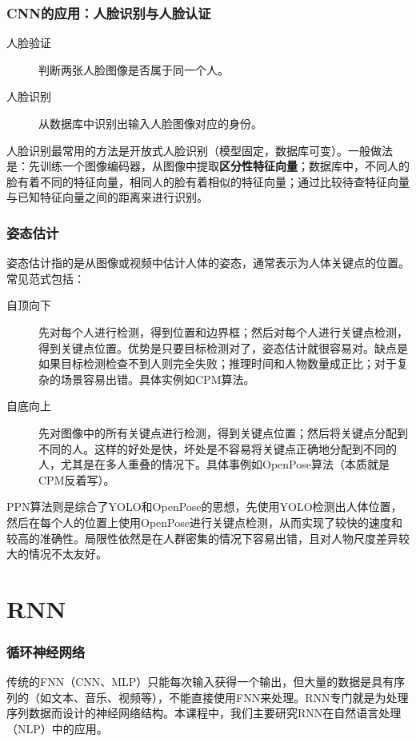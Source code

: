 \documentclass[aspectratio=1610]{ctexbeamer}
\begin{document}
\begin{frame}
    \frametitle{CNN的应用：人脸识别与人脸认证}

    \begin{description}
        \item[人脸验证] 判断两张人脸图像是否属于同一个人。
        \item[人脸识别] 从数据库中识别出输入人脸图像对应的身份。
    \end{description}

    人脸识别最常用的方法是开放式人脸识别（模型固定，数据库可变）。一般做法是：先训练一个图像编码器，从图像中提取\textbf{区分性特征向量}；数据库中，不同人的脸有着不同的特征向量，相同人的脸有着相似的特征向量；通过比较待查特征向量与已知特征向量之间的距离来进行识别。
\end{frame}

\begin{frame}
    \frametitle{姿态估计}

    姿态估计指的是从图像或视频中估计人体的姿态，通常表示为人体关键点的位置。常见范式包括：
    \begin{description}
        \item[自顶向下] 先对每个人进行检测，得到位置和边界框；然后对每个人进行关键点检测，得到关键点位置。优势是只要目标检测对了，姿态估计就很容易对。缺点是如果目标检测检查不到人则完全失败；推理时间和人物数量成正比；对于复杂的场景容易出错。具体实例如CPM算法。
        \item[自底向上] 先对图像中的所有关键点进行检测，得到关键点位置；然后将关键点分配到不同的人。这样的好处是快，坏处是不容易将关键点正确地分配到不同的人，尤其是在多人重叠的情况下。具体事例如OpenPose算法（本质就是CPM反着写）。
    \end{description}

    PPN算法则是综合了YOLO和OpenPose的思想，先使用YOLO检测出人体位置，然后在每个人的位置上使用OpenPose进行关键点检测，从而实现了较快的速度和较高的准确性。局限性依然是在人群密集的情况下容易出错，且对人物尺度差异较大的情况不太友好。

\end{frame}

\section{RNN}

\begin{frame}
    \frametitle{循环神经网络}

    传统的FNN（CNN、MLP）只能每次输入获得一个输出，但大量的数据是具有序列的（如文本、音乐、视频等），不能直接使用FNN来处理。RNN专门就是为处理序列数据而设计的神经网络结构。本课程中，我们主要研究RNN在自然语言处理（NLP）中的应用。
\end{frame}
\end{document}
